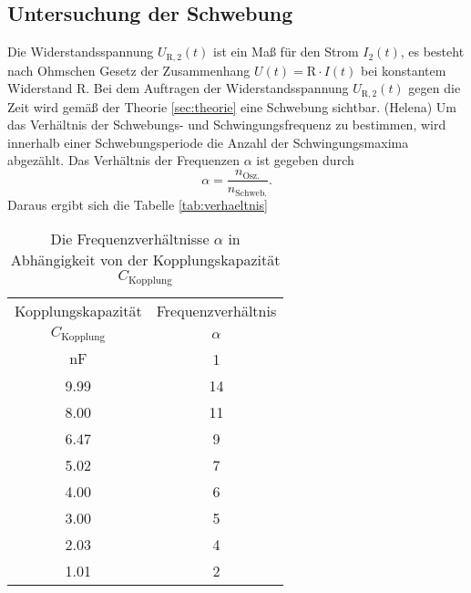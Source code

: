 \subsection{Untersuchung der Schwebung}
\label{sec:Auswertung1}

Die Widerstandsspannung $U_\mathup{R,2}(t)$ ist ein Maß für den Strom $I_\mathup{2}(t)$, es besteht nach Ohmschen Gesetz der Zusammenhang $U(t)=\mathup{R}\cdot I(t)$ bei konstantem Widerstand R.
Bei dem Auftragen der Widerstandsspannung $U_\mathup{R,2}(t)$ gegen die Zeit wird gemäß der Theorie \ref{sec:theorie} eine Schwebung sichtbar.
(Helena) Um das Verhältnis der Schwebungs- und Schwingungsfrequenz zu bestimmen, wird innerhalb einer Schwebungsperiode die Anzahl der Schwingungsmaxima abgezählt. 
Das Verhältnis der Frequenzen $\alpha$ ist gegeben durch
\begin{equation}
	\alpha=\frac{n_\text{Osz.}}{n_\text{Schweb.}}.
\end{equation}
Daraus ergibt sich die Tabelle \ref{tab:verhaeltnis}
\begin{table}
	\centering
	\begin{tabular}{cc}
	\toprule
	{Kopplungskapazität}&{Frequenzverhältnis }\\
	{$C_\mathup{Kopplung}$}&{$\alpha$}\\
	{$\si{\nano\farad}$}&{1}\\
	\midrule
		9.99& 14\\
		8.00& 11\\
		6.47&  9\\
		5.02&  7\\
		4.00&  6\\
		3.00&  5\\
		2.03&  4\\
		1.01&  2\\
	\bottomrule
	\end{tabular}
	\caption{Die Frequenzverhältnisse $\alpha$ in Abhängigkeit von der Kopplungskapazität $C_\mathup{Kopplung}$}
\end{table}

